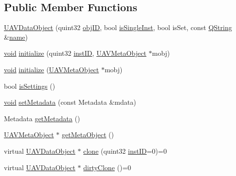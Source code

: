 \subsection*{Public Member Functions}
\begin{DoxyCompactItemize}
\item 
\hyperlink{group___u_a_v_objects_plugin_ga98ff6f0f25a431f4efce59fcbe9176e5}{U\-A\-V\-Data\-Object} (quint32 \hyperlink{group___u_a_v_objects_plugin_gafc50acdaa311c9fd9aaddf90fd578c14}{obj\-I\-D}, bool \hyperlink{group___u_a_v_objects_plugin_gaa279cad3a000cc930e7f386672426bcb}{is\-Single\-Inst}, bool is\-Set, const \hyperlink{group___u_a_v_objects_plugin_gab9d252f49c333c94a72f97ce3105a32d}{Q\-String} \&\hyperlink{glext_8h_ad977737dfc9a274a62741b9500c49a32}{name})
\item 
\hyperlink{group___u_a_v_objects_plugin_ga444cf2ff3f0ecbe028adce838d373f5c}{void} \hyperlink{group___u_a_v_objects_plugin_ga9f3e150d973455c643bc5f582433cd51}{initialize} (quint32 \hyperlink{group___u_a_v_objects_plugin_gad8d656542a04e9fbef607ff178f6d9d3}{inst\-I\-D}, \hyperlink{class_u_a_v_meta_object}{U\-A\-V\-Meta\-Object} $\ast$mobj)
\item 
\hyperlink{group___u_a_v_objects_plugin_ga444cf2ff3f0ecbe028adce838d373f5c}{void} \hyperlink{group___u_a_v_objects_plugin_ga15063ab51e35069afd31709cc2f43276}{initialize} (\hyperlink{class_u_a_v_meta_object}{U\-A\-V\-Meta\-Object} $\ast$mobj)
\item 
bool \hyperlink{group___u_a_v_objects_plugin_ga77932d3af8bd55182bbc39af1f01f447}{is\-Settings} ()
\item 
\hyperlink{group___u_a_v_objects_plugin_ga444cf2ff3f0ecbe028adce838d373f5c}{void} \hyperlink{group___u_a_v_objects_plugin_ga968c4e54cd5088bed83546338e44de6b}{set\-Metadata} (const Metadata \&mdata)
\item 
Metadata \hyperlink{group___u_a_v_objects_plugin_ga8c0434ba77ed0cfbcc2306bdc6b0248c}{get\-Metadata} ()
\item 
\hyperlink{class_u_a_v_meta_object}{U\-A\-V\-Meta\-Object} $\ast$ \hyperlink{group___u_a_v_objects_plugin_gae14c5b7e20f137db436d3c1e7d1949ec}{get\-Meta\-Object} ()
\item 
virtual \hyperlink{class_u_a_v_data_object}{U\-A\-V\-Data\-Object} $\ast$ \hyperlink{group___u_a_v_objects_plugin_ga9c113847ecf6bd99cf7efe3535620e66}{clone} (quint32 \hyperlink{group___u_a_v_objects_plugin_gad8d656542a04e9fbef607ff178f6d9d3}{inst\-I\-D}=0)=0
\item 
virtual \hyperlink{class_u_a_v_data_object}{U\-A\-V\-Data\-Object} $\ast$ \hyperlink{group___u_a_v_objects_plugin_gae075ec1715d23e8bff81e913bc1dd303}{dirty\-Clone} ()=0
\end{DoxyCompactItemize}
